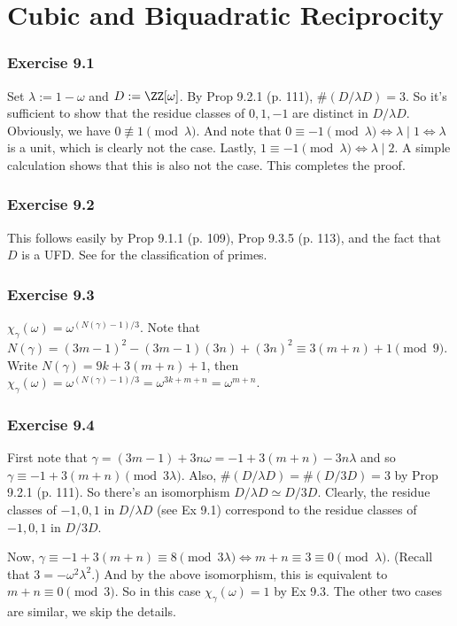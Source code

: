 \documentclass[../Chapter.tex]{subfiles}
\begin{document}
\chapter{Cubic and Biquadratic Reciprocity}

\subsection*{Exercise 9.1}

Set $\lambda:=1-\omega$ and $D:=\ZZ[\omega]$. By Prop 9.2.1 (p. 111), $\#(D/\lambda D)=3$. So it's sufficient to show that the residue classes of $0,1,-1$ are distinct in $D/\lambda D$. Obviously, we have $0\not\equiv1\pmod{\lambda}$. And note that $0\equiv-1\pmod{\lambda} \iff \lambda\mid1 \iff \lambda$ is a unit, which is clearly not the case. Lastly, $1\equiv-1\pmod{\lambda} \iff \lambda\mid2$. A simple calculation shows that this is also not the case. This completes the proof.

\subsection*{Exercise 9.2}

This follows easily by Prop 9.1.1 (p. 109), Prop 9.3.5 (p. 113), and the fact that $D$ is a UFD. See  for the classification of primes.

\subsection*{Exercise 9.3}

$\chi_\gamma(\omega)=\omega^{(N(\gamma)-1)/3}$. Note that $N(\gamma)=(3m-1)^2-(3m-1)(3n)+(3n)^2\equiv3(m+n)+1\pmod{9}$. Write $N(\gamma)=9k+3(m+n)+1$, then $\chi_\gamma(\omega)=\omega^{(N(\gamma)-1)/3}=\omega^{3k+m+n}=\omega^{m+n}$.

\subsection*{Exercise 9.4}

First note that $\gamma=(3m-1)+3n\omega=-1+3(m+n)-3n\lambda$ and so $\gamma\equiv-1+3(m+n) \pmod{3\lambda}$. Also, $\#(D/\lambda D)=\#(D/3D)=3$ by Prop 9.2.1 (p. 111). So there's an isomorphism $D/\lambda D\simeq D/3D$. Clearly, the residue classes of $-1,0,1$ in $D/\lambda D$ (see Ex 9.1) correspond to the residue classes of $-1,0,1$ in $D/3D$.

Now, $\gamma\equiv-1+3(m+n)\equiv8\pmod{3\lambda} \iff m+n\equiv3\equiv0\pmod{\lambda}$. (Recall that $3=-\omega^2\lambda^2$.) And by the above isomorphism, this is equivalent to $m+n\equiv0\pmod{3}$. So in this case $\chi_\gamma(\omega)=1$ by Ex 9.3. The other two cases are similar, we skip the details.
\end{document}
